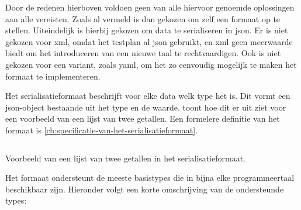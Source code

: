 Door de redenen hierboven voldoen geen van alle hiervoor genoemde oplossingen aan alle vereisten.
Zoals al vermeld is dan gekozen om zelf een formaat op te stellen.
Uiteindelijk is hierbij gekozen om data te serialiseren in json.
Er is niet gekozen voor xml, omdat het testplan al json gebruikt, en xml geen meerwaarde biedt om het introduceren van een nieuwe taal te rechtvaardigen.
Ook is niet gekozen voor een variant, zoals yaml, om het zo eenvoudig mogelijk te maken het formaat te implementeren.

Het serialisatieformaat beschrijft voor elke data welk type het is.
Dit vormt een json-object bestaande uit het type en de waarde.
 toont hoe dit er uit ziet voor een voorbeeld van een lijst van twee getallen.
Een formelere definitie van het formaat is \cref{ch:specificatie-van-het-serialisatieformaat}.

\begin{listing}[h]
    \inputminted{json}{code/format.json}
    \caption{Voorbeeld van een lijst van twee getallen in het serialisatieformaat.}
    \label{lst:serialisation-format}
\end{listing}

Het formaat ondersteunt de meeste basistypes die in bijna elke programmeertaal beschikbaar zijn.
Hieronder volgt een korte omschrijving van de ondersteunde types:

